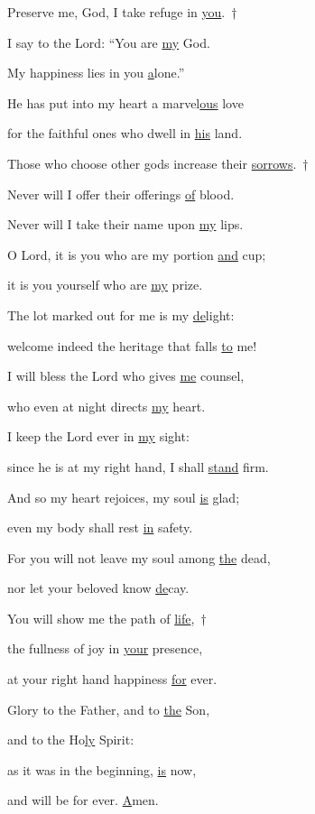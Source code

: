 \noindent Preserve me, God, I take refuge in \uline{you}.~†~\nopagebreak

I say to the Lord: “You are \uline{my} God. ~\GreStar{}~\nopagebreak

My happiness lies in you \uline{a}lone.”

\noindent He has put into my heart a marvel\uline{ous} love ~\GreStar{}~\nopagebreak

for the faithful ones who dwell in \uline{his} land.

\noindent Those who choose other gods increase their \uline{sorrows}.~†~\nopagebreak

Never will I offer their offerings \uline{of} blood. ~\GreStar{}~\nopagebreak

Never will I take their name upon \uline{my} lips.

\noindent O Lord, it is you who are my portion \uline{and} cup; ~\GreStar{}~\nopagebreak

it is you yourself who are \uline{my} prize.

\noindent The lot marked out for me is my \uline{de}light: ~\GreStar{}~\nopagebreak

welcome indeed the heritage that falls \uline{to} me!

\noindent I will bless the Lord who gives \uline{me} counsel, ~\GreStar{}~\nopagebreak

who even at night directs \uline{my} heart.

\noindent I keep the Lord ever in \uline{my} sight: ~\GreStar{}~\nopagebreak

since he is at my right hand, I shall \uline{stand} firm.

\noindent And so my heart rejoices, my soul \uline{is} glad; ~\GreStar{}~\nopagebreak

even my body shall rest \uline{in} safety.

\noindent For you will not leave my soul among \uline{the} dead, ~\GreStar{}~\nopagebreak

nor let your beloved know \uline{de}cay.

\noindent You will show me the path of \uline{life},~†~\nopagebreak

the fullness of joy in \uline{your} presence, ~\GreStar{}~\nopagebreak

at your right hand happiness \uline{for} ever.

\noindent Glory to the Father, and to \uline{the} Son,~\GreStar{}~\nopagebreak

and to the Ho\uline{ly} Spirit:

\noindent as it was in the beginning, \uline{is} now,~\GreStar{}~\nopagebreak

and will be for ever. \uline{A}men.
